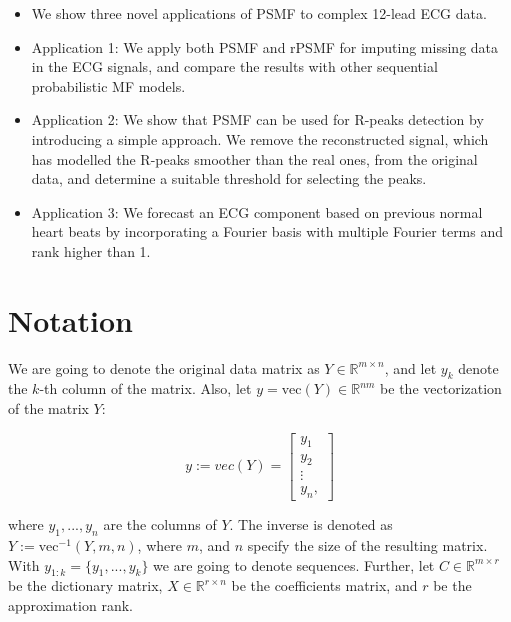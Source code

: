 \documentclass{mldsmsc}
\begin{document}
\begin{itemize}
    \item We show three novel applications of PSMF to complex 12-lead ECG data.
    \item Application 1: We apply both PSMF and rPSMF for imputing missing data in the ECG signals, and compare the results with other sequential probabilistic MF models.
    \item Application 2: We show that PSMF can be used for R-peaks detection by introducing a simple approach. We remove the reconstructed signal, which has modelled the R-peaks smoother than the real ones, from the original data, and determine a suitable threshold for selecting the peaks. 
    \item Application 3: We forecast an ECG component based on previous normal heart beats by incorporating a Fourier basis with multiple Fourier terms and rank higher than 1. 
\end{itemize}

\section{Notation}

We are going to denote the original data matrix as $Y \in \mathbb{R}^{m \times n}$, and let $y_k$ denote the $k$-th column of the matrix. Also, let $y = \text{vec}(Y) \in \mathbb{R}^{nm}$ be the vectorization of the matrix $Y$:

\begin{equation}
    y := vec(Y) = \begin{bmatrix}
        y_1 \\
        y_2 \\
        \vdots \\
        y_n, 
    \end{bmatrix}
\end{equation}

\noindent where $y_1, ..., y_n$ are the columns of $Y$. The inverse is denoted as $Y := \text{vec}^{-1}(Y, m, n)$, where $m$, and $n$ specify the size of the resulting matrix. With $y_{1:k} = \{y_1, ..., y_k\}$ we are going to denote sequences. Further, let $C \in \mathbb{R}^{m \times r}$ be the dictionary matrix, $X \in \mathbb{R}^{r \times n}$ be the coefficients matrix, and $r$ be the approximation rank. \newline
\end{document}

